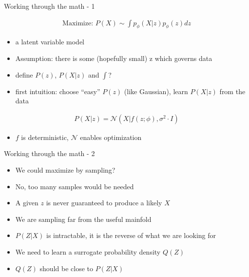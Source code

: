 \documentclass[10pt]{beamer}
\begin{document}
\begin{frame}{Working through the math - 1}

    \begin{gather}
        \text{Maximize: }P(X) \sim \int p_\phi(X|z)p_\phi(z)dz
    \end{gather}
    \begin{itemize}[<+(1)->]
        \item a latent variable model
        \item Assumption: there is some (hopefully small) z which governs data
        \item define $P(z)$, $P(X|z)$ and $\int$?
        \item first intuition: choose ``easy'' $P(z)$ (like Gaussian), learn $P(X|z)$ from the data
    \end{itemize}
    \pause
    \begin{gather}
        P(X|z) = \mathcal{N}(X|f(z;\phi),\sigma^2 \cdot I)
    \end{gather}

    \begin{itemize}[<+->]
        \item $f$ is deterministic, $\mathcal{N}$ enables optimization
    \end{itemize}
\end{frame}

\begin{frame}{Working through the math - 2}
    \begin{itemize}[<+->]
        \item We could maximize by sampling?
        \item No, too many samples would be needed
        \item A given $z$ is never guaranteed to produce a likely $X$
        \item We are sampling far from the useful mainfold
        \item $P(Z|X)$ is intractable, it is the reverse of what we are looking for
        \item We need to learn a surrogate probability density $Q(Z)$
        \item $Q(Z)$ should be close to $P(Z|X)$
    \end{itemize}
    \end{frame}
\end{document}
